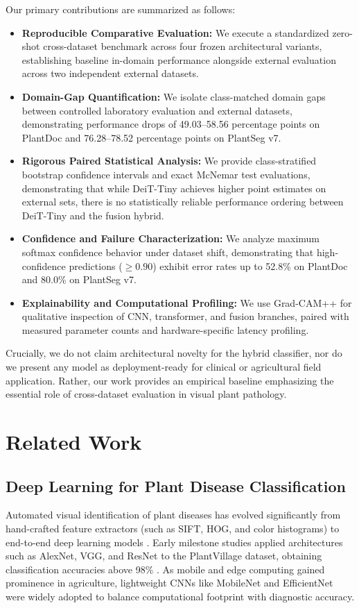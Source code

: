 \documentclass[10pt,journal,compsoc]{IEEEtran}
\begin{document}
Our primary contributions are summarized as follows:
\begin{itemize}
    \item \textbf{Reproducible Comparative Evaluation:} We execute a standardized zero-shot cross-dataset benchmark across four frozen architectural variants, establishing baseline in-domain performance alongside external evaluation across two independent external datasets.
    \item \textbf{Domain-Gap Quantification:} We isolate class-matched domain gaps between controlled laboratory evaluation and external datasets, demonstrating performance drops of 49.03--58.56 percentage points on PlantDoc and 76.28--78.52 percentage points on PlantSeg v7.
    \item \textbf{Rigorous Paired Statistical Analysis:} We provide class-stratified bootstrap confidence intervals and exact McNemar test evaluations, demonstrating that while DeiT-Tiny achieves higher point estimates on external sets, there is no statistically reliable performance ordering between DeiT-Tiny and the fusion hybrid.
    \item \textbf{Confidence and Failure Characterization:} We analyze maximum softmax confidence behavior under dataset shift, demonstrating that high-confidence predictions ($\ge 0.90$) exhibit error rates up to 52.8\% on PlantDoc and 80.0\% on PlantSeg v7.
    \item \textbf{Explainability and Computational Profiling:} We use Grad-CAM++ for qualitative inspection of CNN, transformer, and fusion branches, paired with measured parameter counts and hardware-specific latency profiling.
\end{itemize}

Crucially, we do not claim architectural novelty for the hybrid classifier, nor do we present any model as deployment-ready for clinical or agricultural field application. Rather, our work provides an empirical baseline emphasizing the essential role of cross-dataset evaluation in visual plant pathology.

\section{Related Work}
\subsection{Deep Learning for Plant Disease Classification}
Automated visual identification of plant diseases has evolved significantly from hand-crafted feature extractors (such as SIFT, HOG, and color histograms) to end-to-end deep learning models \cite{kamilaris2018}. Early milestone studies applied architectures such as AlexNet, VGG, and ResNet to the PlantVillage dataset, obtaining classification accuracies above 98\% \cite{mohanty2016, hughes2015}. As mobile and edge computing gained prominence in agriculture, lightweight CNNs like MobileNet \cite{howard2019} and EfficientNet \cite{tan2019} were widely adopted to balance computational footprint with diagnostic accuracy.
\end{document}
